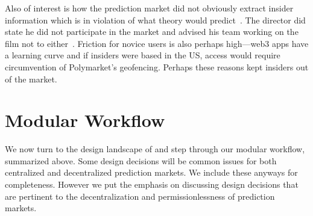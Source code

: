 Also of interest is how the prediction market did not obviously extract insider information which is in violation of what theory would predict~\cite{Han07}. The director did state he did not participate in the market and advised his team working on the film not to either~\cite{Beg24}. Friction for novice users is also perhaps high---web3 apps have a learning curve and if insiders were based in the US, access would require circumvention of Polymarket's geofencing. Perhaps these reasons kept insiders out of the market.


\section{Modular Workflow}
\label{sec:wf}

\begin{center}
\end{center}


We now turn to the design landscape of \depms and step through our modular workflow, summarized above. Some design decisions will be common issues for both centralized and decentralized prediction markets. We include these anyways for completeness. However we put the emphasis on discussing design decisions that are pertinent to the decentralization and permissionlessness of prediction markets. 

